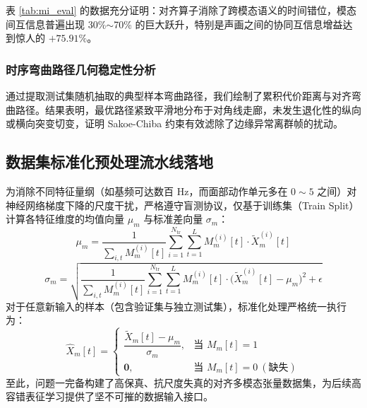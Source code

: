 \begin{table}[htp!]
\centering
\small
\renewcommand\arraystretch{1.3}
\caption{对齐前后多模态互信息 (MI) 与皮尔逊相关系数对比检验表}
\label{tab:mi_eval}
\end{table}

表 \ref{tab:mi_eval} 的数据充分证明：对齐算子消除了跨模态语义的时间错位，模态间互信息普遍出现 30\%$\sim$70\% 的巨大跃升，特别是声画之间的协同互信息增益达到惊人的 $+75.91\%$。

\subsubsection{时序弯曲路径几何稳定性分析}
通过提取测试集随机抽取的典型样本弯曲路径，我们绘制了累积代价距离与对齐弯曲路径。结果表明，最优路径紧致平滑地分布于对角线走廊，未发生退化性的纵向或横向突变切变，证明 Sakoe-Chiba 约束有效滤除了边缘异常离群帧的扰动。

\subsection{数据集标准化预处理流水线落地}
为消除不同特征量纲（如基频可达数百 Hz，而面部动作单元多在 $0\sim 5$ 之间）对神经网络梯度下降的尺度干扰，严格遵守盲测协议，仅基于训练集（Train Split）计算各特征维度的均值向量 $\mu_m$ 与标准差向量 $\sigma_m$：
\begin{equation}
\mu_m = \frac{1}{\sum_{i,t} M_m^{(i)}[t]} \sum_{i=1}^{N_{\text{tr}}} \sum_{t=1}^L M_m^{(i)}[t] \cdot \tilde{X}_m^{(i)}[t]
\end{equation}
\begin{equation}
\sigma_m = \sqrt{ \frac{1}{\sum_{i,t} M_m^{(i)}[t]} \sum_{i=1}^{N_{\text{tr}}} \sum_{t=1}^L M_m^{(i)}[t] \cdot \big(\tilde{X}_m^{(i)}[t] - \mu_m\big)^2 + \epsilon }
\end{equation}
对于任意新输入的样本（包含验证集与独立测试集），标准化处理严格统一执行为：
\begin{equation}
\hat{X}_m[t] = \begin{cases}
\dfrac{\tilde{X}_m[t] - \mu_m}{\sigma_m}, & \text{当 } M_m[t] = 1 \\
\mathbf{0}, & \text{当 } M_m[t] = 0 \ (\text{缺失})
\end{cases}
\end{equation}
至此，问题一完备构建了高保真、抗尺度失真的对齐多模态张量数据集，为后续高容错表征学习提供了坚不可摧的数据输入接口。
